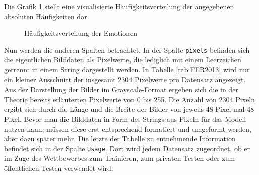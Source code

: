 \documentclass[12pt, a4paper]{report}
\begin{document}
Die Grafik \ref{fig:visualisierungferemotions} stellt eine visualisierte Häufigkeitsverteilung der angegebenen absoluten Häufigkeiten dar.
\begin{figure}[H]
  \centering
{}
  \caption{Häufigkeitsverteilung der Emotionen}
  \label{fig:visualisierungferemotions}
\end{figure}
Nun werden die anderen Spalten betrachtet. In der Spalte \texttt{pixels} befinden sich die eigentlichen Bilddaten als Pixelwerte, die lediglich mit einem Leerzeichen getrennt in einem String dargestellt werden. In Tabelle \ref{tab:FER2013} wird nur ein kleiner Ausschnitt der insgesamt 2304 Pixelwerte pro Datensatz angezeigt. Aus der Darstellung der Bilder im Grayscale-Format ergeben sich die in der Theorie bereits erläuterten Pixelwerte von 0 bis 255. Die Anzahl von 2304 Pixeln ergibt sich durch die Länge und die Breite der Bilder von jeweils 48 Pixel mal 48 Pixel. Bevor man die Bilddaten in Form des Strings aus Pixeln für das Modell nutzen kann, müssen diese erst entsprechend formatiert und umgeformt werden, aber dazu später mehr. Die letzte der Tabelle zu entnehmende Information befindet sich in der Spalte \texttt{Usage}. Dort wird jedem Datensatz zugeordnet, ob er im Zuge des Wettbewerbes zum Trainieren, zum privaten Testen oder zum öffentlichen Testen verwendet wird.
\end{document}
